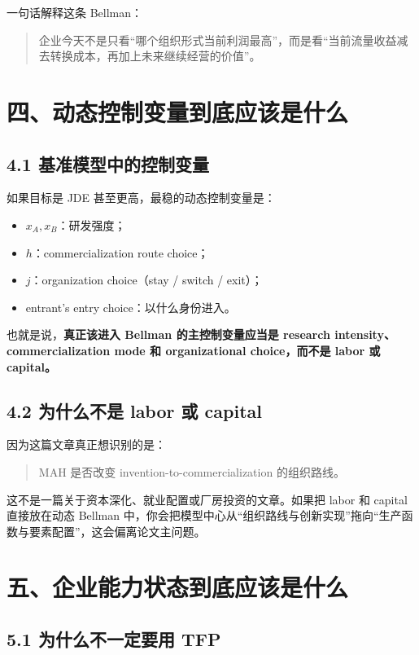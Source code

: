 \documentclass[12pt,fontset=none]{ctexart}
\begin{document}
一句话解释这条 Bellman：

\begin{quote}
企业今天不是只看“哪个组织形式当前利润最高”，而是看“当前流量收益减去转换成本，再加上未来继续经营的价值”。
\end{quote}

\section{四、动态控制变量到底应该是什么}

\subsection{4.1 基准模型中的控制变量}

如果目标是 JDE 甚至更高，最稳的动态控制变量是：

\begin{itemize}[leftmargin=2em]
    \item \(x_A, x_B\)：研发强度；
    \item \(h\)：commercialization route choice；
    \item \(j\)：organization choice（stay / switch / exit）；
    \item entrant's entry choice：以什么身份进入。
\end{itemize}

也就是说，\textbf{真正该进入 Bellman 的主控制变量应当是 research intensity、commercialization mode 和 organizational choice，而不是 labor 或 capital。}

\subsection{4.2 为什么不是 labor 或 capital}

因为这篇文章真正想识别的是：

\begin{quote}
MAH 是否改变 invention-to-commercialization 的组织路线。
\end{quote}

这不是一篇关于资本深化、就业配置或厂房投资的文章。如果把 labor 和 capital 直接放在动态 Bellman 中，你会把模型中心从“组织路线与创新实现”拖向“生产函数与要素配置”，这会偏离论文主问题。

\section{五、企业能力状态到底应该是什么}

\subsection{5.1 为什么不一定要用 TFP}
\end{document}
